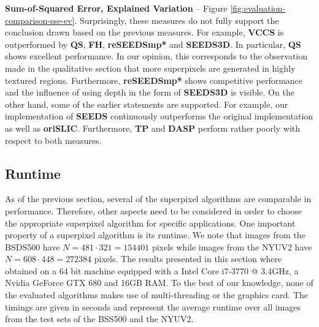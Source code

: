 \textbf{Sum-of-Squared Error, Explained Variation} -- Figure \ref{fig:evaluation-comparison-sse-ev}.
Surprisingly, these measures do not fully support the conclusion drawn based on the previous measures. For example, \textbf{VCCS} is outperformed by \textbf{QS}, \textbf{FH}, \textbf{reSEEDSmp*} and \textbf{SEEDS3D}. In particular, \textbf{QS} shows excellent performance. In our opinion, this corresponds to the observation made in the qualitative section that more superpixels are generated in highly textured regions. Furthermore, \textbf{reSEEDSmp*} shows competitive performance and the influence of using depth in the form of \textbf{SEEDS3D} is visible. On the other hand, some of the earlier statements are supported. For example, our implementation of \textbf{SEEDS} continuously outperforms the original implementation as well as \textbf{oriSLIC}. Furthermore, \textbf{TP} and \textbf{DASP} perform rather poorly with respect to both measures.

\subsection{Runtime}

As of the previous section, several of the superpixel algorithms are comparable in performance. Therefore, other aspects need to be considered in order to choose the appropriate superpixel algorithm for specific applications. One important property of a superpixel algorithm is its runtime. We note that images from the BSDS500 have $N = 481 \cdot 321 = 154401$ pixels while images from the NYUV2 have $N = 608 \cdot 448 = 272384$ pixels. The results presented in this section where obtained on a 64 bit machine equipped with a Intel Core i7-3770 @ 3.4GHz, a Nvidia GeForce GTX 680 and 16GB RAM. To the best of our knowledge, none of the evaluated algorithms makes use of multi-threading or the graphics card. The timings are given in seconds and represent the average runtime over all images from the test sets of the BSS500 and the NYUV2.


